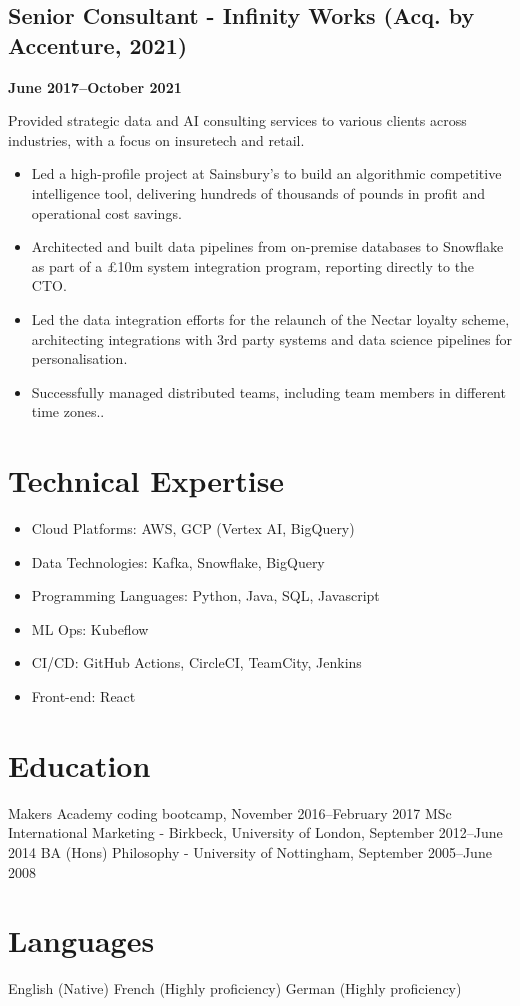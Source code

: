 \documentclass[a4paper]{scrartcl}
\begin{document}
\subsection*{Senior Consultant - Infinity Works (Acq. by Accenture, 2021)}
\textbf{June 2017--October 2021}

Provided strategic data and AI consulting services to various clients across industries, with a focus on insuretech and retail.
\begin{itemize}
	\item Led a high-profile project at Sainsbury's to build an algorithmic competitive intelligence tool, delivering hundreds of thousands of pounds in profit and operational cost savings.
	\item Architected and built data pipelines from on-premise databases to Snowflake as part of a £10m system integration program, reporting directly to the CTO.
	\item Led the data integration efforts for the relaunch of the Nectar loyalty scheme, architecting integrations with 3rd party systems and data science pipelines for personalisation.
	\item Successfully managed distributed teams, including team members in different time zones..
\end{itemize}

\section*{Technical Expertise}
\begin{itemize}
	\item Cloud Platforms: AWS, GCP (Vertex AI, BigQuery)
	\item Data Technologies: Kafka, Snowflake, BigQuery
	\item Programming Languages: Python, Java, SQL, Javascript
	\item ML Ops: Kubeflow
	\item CI/CD: GitHub Actions, CircleCI, TeamCity, Jenkins
	\item Front-end: React
\end{itemize}

\section*{Education}
Makers Academy coding bootcamp, November 2016--February 2017
MSc International Marketing - Birkbeck, University of London, September 2012--June 2014
BA (Hons) Philosophy - University of Nottingham, September 2005--June 2008

\section*{Languages}
English (Native)
French (Highly proficiency)
German (Highly proficiency)
\end{document}
